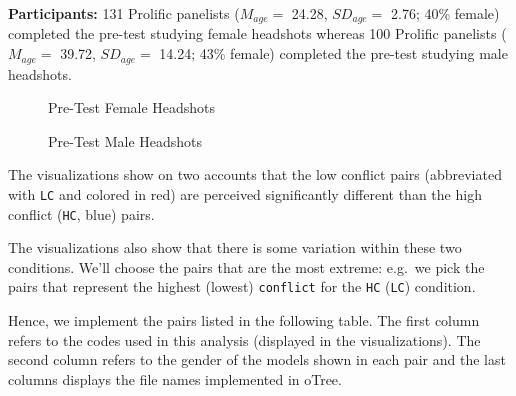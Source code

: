 \documentclass[
  a4paper,
]{scrreprt}
\begin{document}
\textbf{Participants:} 131 Prolific panelists (\(M_{age} =\) 24.28,
\(SD_{age} =\) 2.76; 40\% female) completed the pre-test studying female
headshots whereas 100 Prolific panelists (\(M_{age} =\) 39.72,
\(SD_{age} =\) 14.24; 43\% female) completed the pre-test studying male
headshots.

\begin{figure}

\begin{minipage}[t]{0.50\linewidth}

{\centering 


\caption{Pre-Test Female Headshots}

}

\end{minipage}%
%
\begin{minipage}[t]{0.50\linewidth}

{\centering 


\caption{Pre-Test Male Headshots}

}

\end{minipage}%

\end{figure}

The visualizations show on two accounts that the low conflict pairs
(abbreviated with \texttt{LC} and colored in red) are perceived
significantly different than the high conflict (\texttt{HC}, blue)
pairs.

The visualizations also show that there is some variation within these
two conditions. We'll choose the pairs that are the most extreme:
e.g.~we pick the pairs that represent the highest (lowest)
\texttt{conflict} for the \texttt{HC} (\texttt{LC}) condition.

Hence, we implement the pairs listed in the following table. The first
column refers to the codes used in this analysis (displayed in the
visualizations). The second column refers to the gender of the models
shown in each pair and the last columns displays the file names
implemented in oTree.
\end{document}
